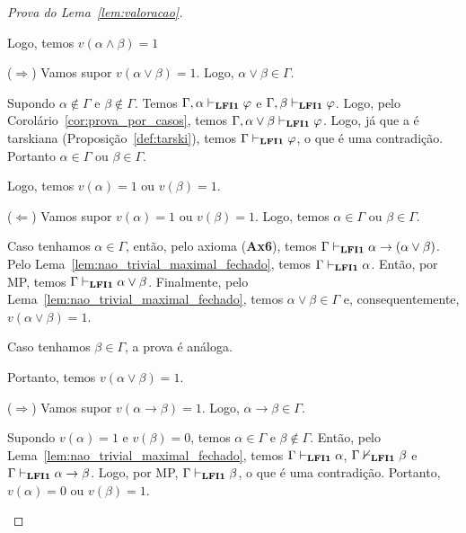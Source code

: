 \begin{proof}[Prova do Lema~\ref{lem:valoracao}]
\begin{provaporcasos}
\begin{adjustwidth}{1cm}{}
                    Logo, temos $v(\alpha \land \beta) = 1$

                \end{adjustwidth}


                \begin{adjustwidth}{1cm}{}
                    \noindent ($\Longrightarrow$) Vamos supor $v(\alpha \lor \beta) = 1$. Logo, $\alpha \lor \beta \in \Gamma$.

                    \noindent Supondo $\alpha \notin \Gamma$ e $\beta \notin \Gamma$. Temos $\Gamma, \alpha \vdash_{{\normalfont\textbf{LFI1}}{}} \varphi$ e $\Gamma, \beta \vdash_{{\normalfont\textbf{LFI1}}{}} \varphi$. Logo, pelo Corolário~\ref{cor:prova_por_casos}, temos $\Gamma, \alpha \lor \beta \vdash_{{\normalfont\textbf{LFI1}}{}} \varphi$. Logo, já que a \lfium{} é tarskiana (Proposição~\ref{def:tarski}), temos $\Gamma \vdash_{{\normalfont\textbf{LFI1}}{}} \varphi$, o que é uma contradição. Portanto $\alpha \in \Gamma$ ou $\beta \in \Gamma$.
                    
                    \noindent Logo, temos $v(\alpha) = 1$ ou $v(\beta) = 1$.

                    \noindent ($\Longleftarrow$) Vamos supor $v(\alpha) = 1$ ou $v(\beta) = 1$. Logo, temos $\alpha \in \Gamma$ ou $\beta \in \Gamma$.

                    \noindent Caso tenhamos $\alpha \in \Gamma$, então, pelo axioma (\textbf{Ax6}), temos $\Gamma \vdash_{{\normalfont\textbf{LFI1}}{}} \alpha \to (\alpha \lor \beta)$. Pelo Lema~\ref{lem:nao_trivial_maximal_fechado}, temos $\Gamma \vdash_{{\normalfont\textbf{LFI1}}{}} \alpha$. Então, por MP, temos $\Gamma \vdash_{{\normalfont\textbf{LFI1}}{}} \alpha \lor \beta$. Finalmente, pelo Lema~\ref{lem:nao_trivial_maximal_fechado}, temos $\alpha \lor \beta \in \Gamma$ e, consequentemente, $v(\alpha \lor \beta) = 1$.

                    \noindent Caso tenhamos $\beta \in \Gamma$, a prova é análoga.

                    \noindent Portanto, temos $v(\alpha \lor \beta) = 1$.

                \end{adjustwidth}


                    \begin{adjustwidth}{1cm}{}
                        
                        \noindent ($\Longrightarrow$) Vamos supor $v(\alpha \to \beta) = 1$. Logo, $\alpha \to \beta \in \Gamma$.

                        \noindent Supondo $v(\alpha) = 1$ e $v(\beta) = 0$, temos $\alpha \in \Gamma$ e $\beta \not \in \Gamma$. Então, pelo Lema~\ref{lem:nao_trivial_maximal_fechado}, temos $\Gamma \vdash_{{\normalfont\textbf{LFI1}}{}} \alpha$, $\Gamma \nvdash_{{\normalfont\textbf{LFI1}}{}} \beta$ e $\Gamma \vdash_{{\normalfont\textbf{LFI1}}{}} \alpha \to \beta$. Logo, por MP, $\Gamma \vdash_{{\normalfont\textbf{LFI1}}{}} \beta$, o que é uma contradição. Portanto, $v(\alpha) = 0$ ou $v(\beta) = 1$.


\end{adjustwidth}
\end{provaporcasos}
\end{proof}
